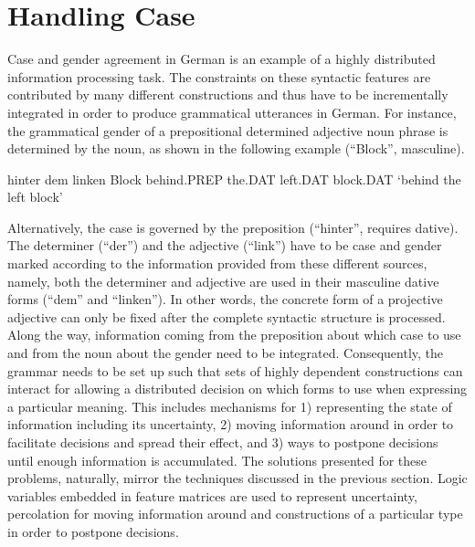 \section{Handling Case}
\label{s:handling-case}
Case and gender agreement in German is an example of a 
highly distributed information
processing task. The constraints on these syntactic features 
are contributed by many different constructions 
and thus have to be incrementally integrated in order
to produce grammatical utterances in German. For instance, the
grammatical gender of a prepositional determined adjective noun phrase
is determined by the noun, as shown in the following example (``Block'', masculine).
\begin{example}
\label{e:hinter-dem-linken-block}
\gll hinter dem linken Block 
behind.PREP the.DAT left.DAT block.DAT 
\glt `behind the left block'
\glend
\end{example}
Alternatively, the case is governed by the preposition (``hinter'', requires dative). The determiner (``der'') and the
adjective (``link'') have to be case and gender marked according to
the information provided from these different sources,
namely, both the determiner and adjective are used in
their masculine dative forms (``dem'' and ``linken''). In other words,
the concrete form of a projective adjective can only be fixed after
the complete syntactic structure is processed. Along the way, 
information coming from the preposition about which
case to use and from the noun about the gender need to be integrated. 
Consequently, the grammar needs to be set up such that sets of 
highly dependent constructions can interact for allowing a distributed  
decision on which forms to use when expressing a particular
meaning. This includes mechanisms for 1) representing the
state of information including its uncertainty, 2) moving information
around in order to facilitate decisions and spread their effect, and
3) ways to postpone decisions until enough information is
accumulated. The solutions presented for these problems, naturally,
mirror the techniques discussed in the previous section. Logic
variables embedded in feature matrices are used to represent
uncertainty, percolation for moving information around and
constructions of a particular type in order to postpone decisions.

